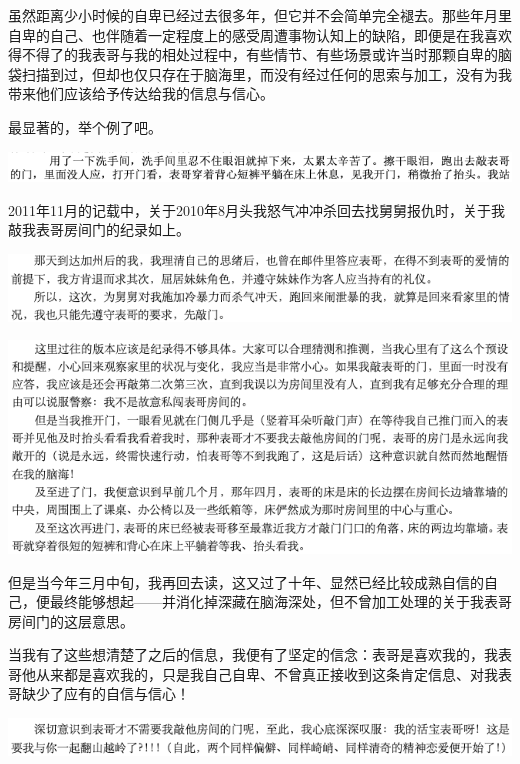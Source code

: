 \documentclass[9pt, b5paper]{article}
\begin{document}
虽然距离少小时候的自卑已经过去很多年，但它并不会简单完全褪去。那些年月里自卑的自己、也伴随着一定程度上的感受周遭事物认知上的缺陷，即便是在我喜欢得不得了的我表哥与我的相处过程中，有些情节、有些场景或许当时那颗自卑的脑袋扫描到过，但却也仅只存在于脑海里，而没有经过任何的思索与加工，没有为我带来他们应该给予传达给我的信息与信心。

最显著的，举个例了吧。

\begin{center}
\includegraphics[width=.9\linewidth]{./pic/backups_plans_20210426_161140.png}
\end{center}

2011年11月的记载中，关于2010年8月头我怒气冲冲杀回去找舅舅报仇时，关于我敲我表哥房间门的纪录如上。 

\begin{center}
\includegraphics[width=.9\linewidth]{./pic/backups_plans_20210426_161859.png}
\end{center}

\begin{center}
\includegraphics[width=.9\linewidth]{./pic/backups_plans_20210426_161924.png}
\end{center}

但是当今年三月中旬，我再回去读，这又过了十年、显然已经比较成熟自信的自己，便最终能够想起——并消化掉深藏在脑海深处，但不曾加工处理的关于我表哥房间门的这层意思。

当我有了这些想清楚了之后的信息，我便有了坚定的信念：表哥是喜欢我的，我表哥他从来都是喜欢我的，只是我自己自卑、不曾真正接收到这条肯定信息、对我表哥缺少了应有的自信与信心！

\begin{center}
\includegraphics[width=.9\linewidth]{./pic/backups_plans_20210426_162149.png}
\end{center}
\end{document}
